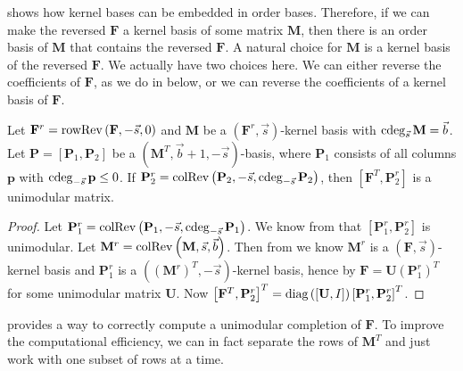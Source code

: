 shows how kernel bases can be embedded in order bases. Therefore,
if we can make the reversed $\mathbf{F}$ a kernel basis of some matrix
$\mathbf{M}$, then there is an order basis of $\mathbf{M}$ that
contains the reversed $\mathbf{F}$. A natural choice for $\mathbf{M}$
is a kernel basis of the reversed $\mathbf{F}$.  We actually have
two choices here. We can either reverse the coefficients of $\mathbf{F}$,
as we do in  below, or we can
reverse the coefficients of a kernel basis of $\mathbf{F}$.
\begin{lem}
\label{lem:unimodularComputation}Let $\mathbf{F}^{r}=\operatorname{rowRev}\left(\mathbf{F},-\vec{s},0\right)$
and $\mathbf{M}$ be a $(\mathbf{F}^{r},\vec{s})$-kernel basis with
$\cdeg_{\vec{s}}\mathbf{M}=\vec{b}$. Let $\mathbf{P}=\left[\mathbf{P}_{1},\mathbf{P}_{2}\right]$
be a $\left(\mathbf{M}^{T},\vec{b}+1,-\vec{s}\right)$-basis, where
$\mathbf{P}_{1}$ consists of all columns $\mathbf{p}$ with $\cdeg_{-\vec{s}}\mathbf{p}\le0$.
If $\mathbf{P}_{2}^{r}=\colRev\left(\mathbf{P}_{2},-\vec{s},\cdeg_{-\vec{s}}\mathbf{P}_{2}\right)$,
then $\left[\mathbf{F}^{T},\mathbf{P}_{2}^{r}\right]$ is a unimodular
matrix.\end{lem}
\begin{proof}
Let $\mathbf{P}_{1}^{r}=\colRev\left(\mathbf{P}_{1},-\vec{s},\cdeg_{-\vec{s}}\mathbf{P}_{1}\right)$.
We know from  that $\left[\mathbf{P}_{1}^{r},\mathbf{P}_{2}^{r}\right]$
is unimodular. Let $\mathbf{M}^{r}=\operatorname{colRev}\left(\mathbf{M},\vec{s},\vec{b}\right)$.
Then from  we know $\mathbf{M}^{r}$
is a $\left(\mathbf{F},\vec{s}\right)$-kernel basis and $\mathbf{P}_{1}^{r}$
is a $\left(\left(\mathbf{M}^{r}\right)^{T},-\vec{s}\right)$-kernel
basis, hence by 
$\mathbf{F}=\mathbf{U}\left(\mathbf{P}_{1}^{r}\right)^{T}$ for some
unimodular matrix $\mathbf{U}$. Now $\left[\mathbf{F}^{T},\mathbf{P}_{2}^{r}\right]^{T}=\mbox{diag}\left(\left[\mathbf{U},I\right]\right)\left[\mathbf{P}_{1}^{r},\mathbf{P}_{2}^{r}\right]^{T}$.
\end{proof}
 provides a way to correctly
compute a unimodular completion of $\mathbf{F}$. To improve the computational
efficiency, we can in fact separate the rows of $\mathbf{M}^{T}$
and just work with one subset of rows at a time. 
